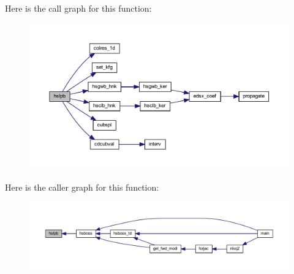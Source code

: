 Here is the call graph for this function\+:\nopagebreak
\begin{figure}[H]
\begin{center}
\leavevmode
\includegraphics[width=350pt]{Leroi_8f90_a247cf958ed9d5aa90d05eee29e6a9582_cgraph}
\end{center}
\end{figure}
Here is the caller graph for this function\+:\nopagebreak
\begin{figure}[H]
\begin{center}
\leavevmode
\includegraphics[width=350pt]{Leroi_8f90_a247cf958ed9d5aa90d05eee29e6a9582_icgraph}
\end{center}
\end{figure}
\mbox{\label{Leroi_8f90_a918a25836d554d239ee900a00fbefbb6}} 
